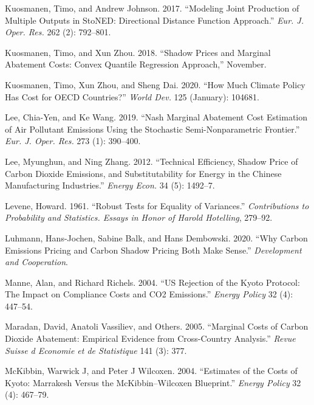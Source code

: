 \documentclass[
  10pt,
]{article}
\begin{document}
\leavevmode\hypertarget{ref-Kuosmanen2017}{}%
Kuosmanen, Timo, and Andrew Johnson. 2017. ``Modeling Joint Production
of Multiple Outputs in StoNED: Directional Distance Function Approach.''
\emph{Eur. J. Oper. Res.} 262 (2): 792--801.

\leavevmode\hypertarget{ref-Kuosmanen2018b}{}%
Kuosmanen, Timo, and Xun Zhou. 2018. ``Shadow Prices and Marginal
Abatement Costs: Convex Quantile Regression Approach,'' November.

\leavevmode\hypertarget{ref-Kuosmanen2020}{}%
Kuosmanen, Timo, Xun Zhou, and Sheng Dai. 2020. ``How Much Climate
Policy Has Cost for OECD Countries?'' \emph{World Dev.} 125 (January):
104681.

\leavevmode\hypertarget{ref-Lee2019}{}%
Lee, Chia-Yen, and Ke Wang. 2019. ``Nash Marginal Abatement Cost
Estimation of Air Pollutant Emissions Using the Stochastic
Semi-Nonparametric Frontier.'' \emph{Eur. J. Oper. Res.} 273 (1):
390--400.

\leavevmode\hypertarget{ref-Lee2012}{}%
Lee, Myunghun, and Ning Zhang. 2012. ``Technical Efficiency, Shadow
Price of Carbon Dioxide Emissions, and Substitutability for Energy in
the Chinese Manufacturing Industries.'' \emph{Energy Econ.} 34 (5):
1492--7.

\leavevmode\hypertarget{ref-Levene1961}{}%
Levene, Howard. 1961. ``Robust Tests for Equality of Variances.''
\emph{Contributions to Probability and Statistics. Essays in Honor of
Harold Hotelling}, 279--92.

\leavevmode\hypertarget{ref-Luhmann2020}{}%
Luhmann, Hans-Jochen, Sabine Balk, and Hans Dembowski. 2020. ``Why
Carbon Emissions Pricing and Carbon Shadow Pricing Both Make Sense.''
\emph{Development and Cooperation}.

\leavevmode\hypertarget{ref-Manne2004}{}%
Manne, Alan, and Richard Richels. 2004. ``US Rejection of the Kyoto
Protocol: The Impact on Compliance Costs and CO2 Emissions.''
\emph{Energy Policy} 32 (4): 447--54.

\leavevmode\hypertarget{ref-Maradan2005}{}%
Maradan, David, Anatoli Vassiliev, and Others. 2005. ``Marginal Costs of
Carbon Dioxide Abatement: Empirical Evidence from Cross-Country
Analysis.'' \emph{Revue Suisse d Economie et de Statistique} 141 (3):
377.

\leavevmode\hypertarget{ref-McKibbin2004}{}%
McKibbin, Warwick J, and Peter J Wilcoxen. 2004. ``Estimates of the
Costs of Kyoto: Marrakesh Versus the McKibbin--Wilcoxen Blueprint.''
\emph{Energy Policy} 32 (4): 467--79.
\end{document}
